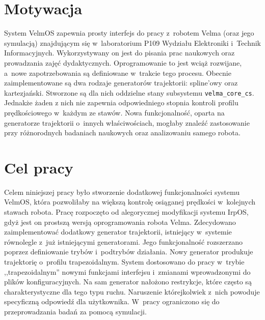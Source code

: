 		\section{Motywacja}
		\label{s:motywacja}
		System VelmOS zapewnia prosty interfejs do pracy z~robotem Velma (oraz jego symulacją) znajdującym się w~laboratorium P109 Wydziału Elektroniki i~Technik Informacyjnych. Wykorzystywany on jest do pisania prac naukowych oraz prowadzania zajęć dydaktycznych. Oprogramowanie to jest wciąż rozwijane, a~nowe zapotrzebowania są definiowane w~trakcie tego procesu. Obecnie zaimplementowane są dwa rodzaje generatorów trajektorii: spline'owy oraz kartezjański. Stworzone są dla nich oddzielne stany subsystemu \texttt{velma\_core\_cs}. Jednakże żaden z nich nie zapewnia odpowiedniego stopnia kontroli profilu prędkościowego w~każdym ze stawów. Nowa funkcjonalność, oparta na generatorze trajektorii o~innych właściwościach, mogłaby znaleźć zastosowanie przy różnorodnych badaniach naukowych oraz analizowaniu samego robota. 
		
		
		
		
		
		
		\section{Cel pracy}
		\label{s:cel}
		Celem niniejszej pracy było stworzenie dodatkowej funkcjonalności systemu VelmOS, która pozwoliłaby na większą kontrolę osiąganej prędkości w~kolejnych stawach robota.
		Pracę rozpoczęto od alegorycznej modyfikacji systemu IrpOS, gdyż jest on prostszą wersją oprogramowania robota Velma. Zdecydowano zaimplementować dodatkowy generator trajektorii, istniejący w~systemie równolegle z~już istniejącymi generatorami. Jego funkcjonalność rozszerzano poprzez definiowanie trybów i~podtrybów działania. Nowy generator produkuje trajektorię o~profilu trapezoidalnym. System dostosowano do pracy w~trybie ,,trapezoidalnym'' nowymi funkcjami interfejsu i~zmianami wprowadzonymi do plików konfiguracyjnych. Na sam generator nałożono restrykcje, które często są charakterystyczne dla tego typu ruchu. Naruszenie którejkolwiek z~nich powoduje specyficzną odpowiedź dla użytkownika. W~pracy ograniczono się do przeprowadzania badań za pomocą symulacji.
		
